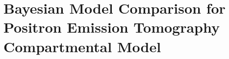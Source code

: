 \chapter{Bayesian Model Comparison for Positron Emission Tomography
  Compartmental Model}
\label{cha:Bayesian Model Comparison for Positron Emission Tomography
  Compartmental Model}
